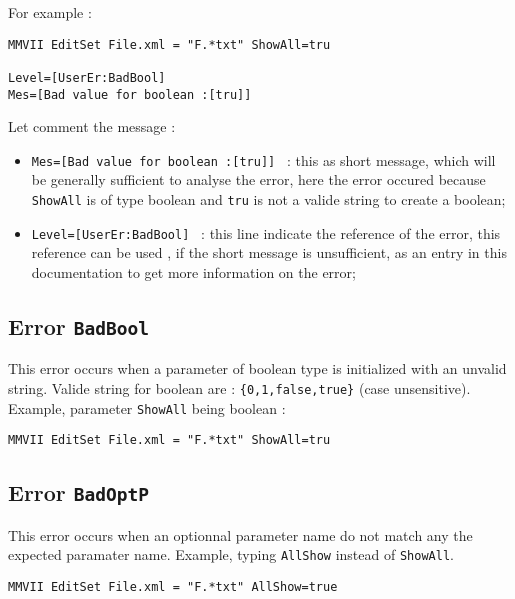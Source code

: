 For example :

\begin{verbatim}
MMVII EditSet File.xml = "F.*txt" ShowAll=tru

Level=[UserEr:BadBool]
Mes=[Bad value for boolean :[tru]]
\end{verbatim}

Let comment the message :

\begin{itemize}
   \item {\tt Mes=[Bad value for boolean :[tru]] } : this as short message, which will be generally
         sufficient to analyse the error, here the error occured because {\tt ShowAll} is of type
         boolean and {\tt tru} is not a valide string to create a boolean;

   \item {\tt Level=[UserEr:BadBool] } : this line indicate the reference of the error,
         this reference can be used , if the short message is unsufficient, as an entry in this
         documentation to get more information on the error;

\end{itemize}


\subsection{Error {\tt BadBool}}

This error occurs when a parameter of boolean type is initialized with an unvalid string.
Valide string for boolean are : {\tt \{0,1,false,true\}} (case unsensitive).
Example, parameter {\tt ShowAll} being boolean :

\begin{verbatim}
MMVII EditSet File.xml = "F.*txt" ShowAll=tru
\end{verbatim}


\subsection{Error {\tt BadOptP}}

This error occurs when an optionnal parameter name do not match any the expected
paramater name. Example, typing {\tt AllShow} instead of {\tt ShowAll}.

\begin{verbatim}
MMVII EditSet File.xml = "F.*txt" AllShow=true
\end{verbatim}

